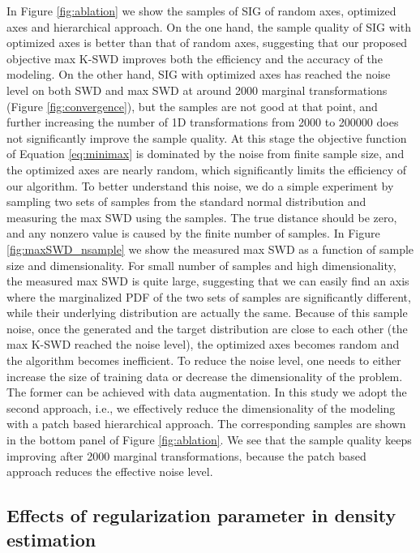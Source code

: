 \documentclass{article}
\begin{document}
In Figure \ref{fig:ablation} we show the samples of SIG of random axes, optimized axes and hierarchical approach. On the one hand, the sample quality of SIG with optimized axes is better than that of random axes, suggesting that our proposed objective max K-SWD improves both the efficiency and the accuracy of the modeling. On the other hand, SIG with optimized axes has reached the noise level on both SWD and max SWD at around 2000 marginal transformations (Figure \ref{fig:convergence}), but the samples are not good at that point, and further increasing the number of 1D transformations from 2000 to 200000 does not significantly improve the sample quality. At this stage the objective function of Equation \ref{eq:minimax} is dominated by the noise from finite sample size, and the optimized axes are nearly random, which significantly limits the efficiency of our algorithm. To better understand this noise, we do a simple experiment by sampling two sets of samples from the standard normal distribution  and measuring the max SWD using the samples. The true distance should be zero, and any nonzero value is caused by the finite number of samples. In Figure \ref{fig:maxSWD_nsample} we show the measured max SWD as a function of sample size and dimensionality. For small number of samples and high dimensionality, the measured max SWD is quite large, suggesting that we can easily find an axis where the marginalized PDF of the two sets of samples are significantly different, while their underlying distribution are actually the same. Because of this sample noise, once the generated and the target distribution are close to each other (the max K-SWD reached the noise level), the optimized axes becomes random and the algorithm becomes inefficient. To reduce the noise level, one needs to either increase the size of training data or decrease the dimensionality of the problem. The former can be achieved with data augmentation. In this study we adopt the second approach, i.e., we effectively reduce the dimensionality of the modeling with a patch based hierarchical approach. The corresponding samples are shown in the bottom panel of Figure \ref{fig:ablation}. We see that the sample quality keeps improving after 2000 marginal transformations, because the patch based approach reduces the effective noise level.

\subsection{Effects of regularization parameter  in density estimation}
\end{document}
